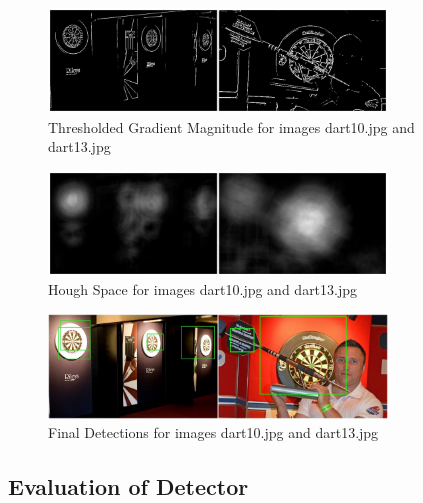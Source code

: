 \documentclass[conference]{IEEEtran}
\begin{document}
\begin{figure}[ht!]
	\centering
	\includegraphics[width=90mm]{img/Task3_Images/threshold_dart.jpg}
	\caption{Thresholded Gradient Magnitude for images dart10.jpg and dart13.jpg}
\end{figure}


\begin{figure}[ht!]
	\centering
	\includegraphics[width=90mm]{img/Task3_Images/houghspace_dart.jpg}
	\caption{Hough Space for images dart10.jpg and dart13.jpg}
\end{figure}

\begin{figure}[ht!]
	\centering
	\includegraphics[width=90mm]{img/Task3_Images/detected_dart.jpg}
	\caption{Final Detections for images dart10.jpg and dart13.jpg}
\end{figure}

\subsection{Evaluation of Detector}
\end{document}
